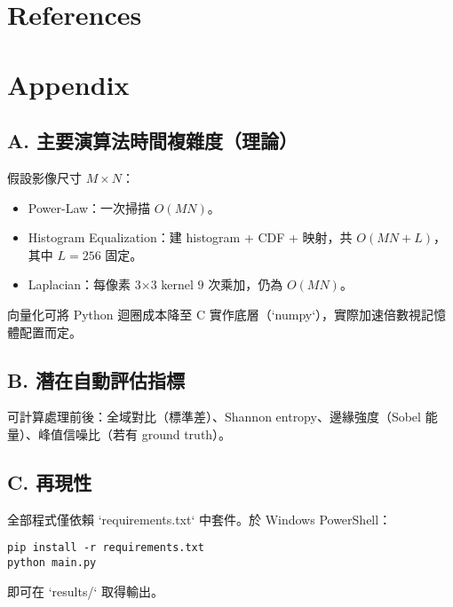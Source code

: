 \documentclass[12pt,a4paper]{article}
\begin{document}
\section{References}



\section{Appendix}
\subsection*{A. 主要演算法時間複雜度（理論）}
假設影像尺寸 \(M\times N\)：
\begin{itemize}
  \item Power-Law：一次掃描 \(O(MN)\)。
  \item Histogram Equalization：建 histogram + CDF + 映射，共 \(O(MN + L)\)，其中 \(L=256\) 固定。
  \item Laplacian：每像素 3×3 kernel \(9\) 次乘加，仍為 \(O(MN)\)。
\end{itemize}
向量化可將 Python 迴圈成本降至 C 實作底層（`numpy`），實際加速倍數視記憶體配置而定。

\subsection*{B. 潛在自動評估指標}
可計算處理前後：全域對比（標準差）、Shannon entropy、邊緣強度（Sobel 能量）、峰值信噪比（若有 ground truth）。

\subsection*{C. 再現性}
全部程式僅依賴 `requirements.txt` 中套件。於 Windows PowerShell：
\begin{verbatim}
pip install -r requirements.txt
python main.py
\end{verbatim}
即可在 `results/` 取得輸出。
\end{document}
